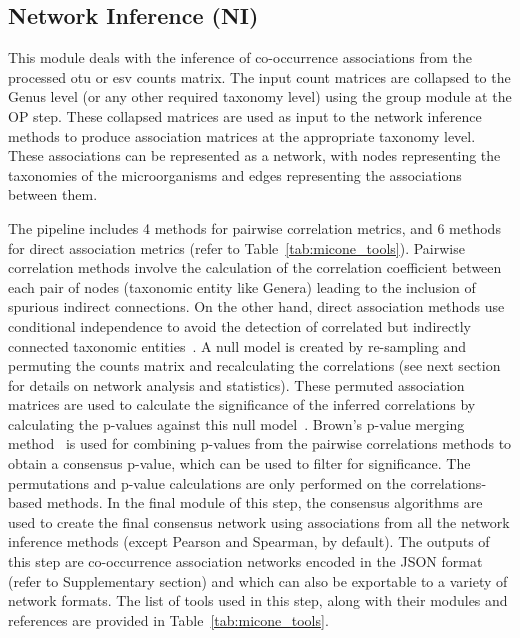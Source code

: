 \documentclass[letterpaper,12pt]{article}
\begin{document}
  \subsection*{Network Inference (NI)}
  \vspace{-5mm}
  This module deals with the inference of co-occurrence associations from the processed \ac{otu} or \ac{esv} counts matrix.
  The input count matrices are collapsed to the Genus level (or any other required taxonomy level) using the group module at the OP step.
  These collapsed matrices are used as input to the network inference methods to produce association matrices at the appropriate taxonomy level.
  These associations can be represented as a network, with nodes representing the taxonomies of the microorganisms and edges representing the associations between them.

  The pipeline includes 4 methods for pairwise correlation metrics, and 6 methods for direct association metrics (refer to Table~\ref{tab:micone_tools}).
  Pairwise correlation methods involve the calculation of the correlation coefficient between each pair of nodes (taxonomic entity like Genera) leading to the inclusion of spurious indirect connections.
  On the other hand, direct association methods use conditional independence to avoid the detection of correlated but indirectly connected taxonomic entities~\cite{Kurtz2015,Menon2018}.
  A null model is created by re-sampling and permuting the counts matrix and recalculating the correlations (see next section for details on network analysis and statistics).
  These permuted association matrices are used to calculate the significance of the inferred correlations by calculating the p-values against this null model~\cite{Watts2018}.
  Brown's p-value merging method~\cite{brown_400_1975} is used for combining p-values from the pairwise correlations methods to obtain a consensus p-value, which can be used to filter for significance.
  The permutations and p-value calculations are only performed on the correlations-based methods.
  In the final module of this step, the consensus algorithms are used to create the final consensus network using associations from all the network inference methods (except Pearson and Spearman, by default).
  The outputs of this step are co-occurrence association networks encoded in the JSON format (refer to Supplementary section) and which can also be exportable to a variety of network formats.
  The list of tools used in this step, along with their modules and references are provided in Table~\ref{tab:micone_tools}.
\end{document}
